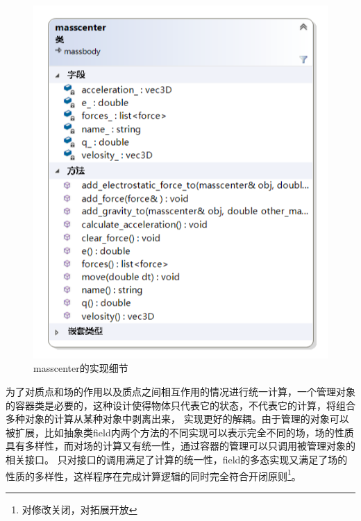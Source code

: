 \begin{figure} 
    \centering 
    \includegraphics[width=.8\textwidth]{ClassDiagram31.png}
\caption{masscenter的实现细节} %
\label{cd31} %
\end{figure}

为了对质点和场的作用以及质点之间相互作用的情况进行统一计算，一个管理对象的容器类是必要的，这种设计使得物体只代表它的状态，不代表它的计算，将组合多种对象的计算从某种对象中剥离出来，
实现更好的解耦。由于管理的对象可以被扩展，比如抽象类field内两个方法的不同实现可以表示完全不同的场，场的性质具有多样性，而对场的计算又有统一性，通过容器的管理可以只调用被管理对象的相关接口。
只对接口的调用满足了计算的统一性，field的多态实现又满足了场的性质的多样性，这样程序在完成计算逻辑的同时完全符合开闭原则\footnote{对修改关闭，对拓展开放}。

